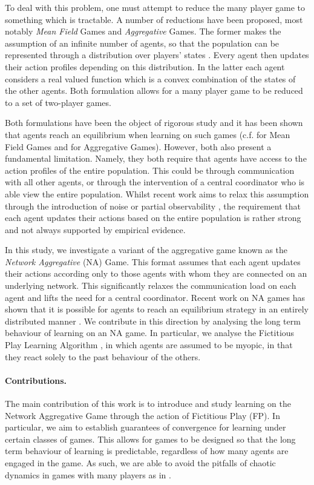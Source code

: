 \documentclass{article}
\theoremstyle{definition}
\begin{document}
To deal with this problem, one must attempt to reduce the many player game to something which is
tractable. A number of reductions have been proposed, most notably \emph{Mean Field} Games
and \emph{Aggregative} Games. The former makes the assumption of an infinite
number of agents, so that the population can be represented through a distribution over players'
states \cite{Huang2006}. Every agent then updates their action profiles depending on this
distribution. In the latter each agent considers a real valued function which is a convex
combination of the states of the other agents. Both formulation allows for a many player game to be reduced to a set of two-player games.

Both formulations have been the object of rigorous study and it has been shown that agents reach an equilibrium when learning on such games (c.f. \cite{Perrin2020} for Mean Field Games and
\cite{Jensen2010, DePersis2020, Parise2020} for Aggregative Games). However, both also present a fundamental limitation.
Namely, they both require that agents have access to the action profiles of the entire population.
This could be through communication with all other agents, or through the intervention of a central
coordinator who is able view the entire population. Whilst recent work aims to relax this assumption
through the introduction of noise \cite{Perrin2020} or partial observability \cite{Elie2020}, the
requirement that each agent updates their actions based on the entire population is rather strong and not always supported by empirical evidence.

In this study, we investigate a variant of the aggregative game known as the \emph{Network
Aggregative} (NA) Game. This format assumes that each agent updates their actions according only to those agents with whom they are connected on an underlying network. This significantly relaxes the communication load on each agent and
lifts the need for a central coordinator. Recent work on NA games has shown that it is possible
for agents to reach an equilibrium strategy in an entirely distributed manner \cite{Koshal2016, Shokri2020, Shokri2021, Parise2015}. We contribute in this direction by analysing the long term behaviour of learning on an NA game. In particular, we analyse the Fictitious Play Learning
Algorithm \cite{Brown1949, Harris1998}, in which agents are assumed to be myopic, in that they react solely to the past behaviour of the others.


\paragraph{Contributions.}
%
  The main contribution of this work is to introduce and study learning on the Network Aggregative Game
  through the action of Fictitious Play (FP). In particular, we aim to establish guarantees of convergence for learning under certain classes of games. This allows for games to be designed so that the long term behaviour of learning is predictable, regardless of how many agents are engaged in the game. As such, we are able to avoid the pitfalls of chaotic dynamics in games with many players as in \cite{Sanders2018}.
\end{document}
